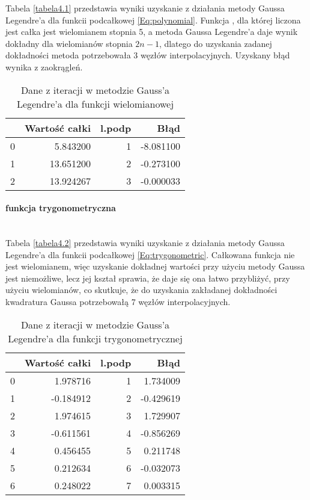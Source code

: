 \documentclass[12pt,twoside]{article}
\begin{document}
Tabela \eqref{tabela4.1} przedstawia wyniki uzyskanie z działania metody Gaussa Legendre'a dla funkcii podcałkowej \eqref{Eq:polynomial}. Funkcja , dla której liczona jest całka jest wielomianem stopnia 5, a metoda Gaussa Legendre'a daje wynik dokładny dla wielomianów stopnia $2n-1$, dlatego do uzyskania zadanej dokładności metoda potrzebowała 3 węzłów interpolacyjnych. Uzyskany błąd wynika z zaokrągleń.

\begin{table}[H]
\centering 
\caption{Dane z iteracji w metodzie Gauss'a Legendre'a dla funkcji wielomianowej}
\label{tabela4.1}
\begin{tabular}{lrrr}
\toprule
{} &  Wartość całki &  l.podp &      Błąd \\
\midrule
0 &       5.843200 &       1 & -8.081100 \\
1 &      13.651200 &       2 & -0.273100 \\
2 &      13.924267 &       3 & -0.000033 \\
\bottomrule
\end{tabular}
\end{table}

\paragraph{funkcja trygonometryczna}\mbox{} \\

Tabela \eqref{tabela4.2} przedstawia wyniki uzyskanie z działania metody Gaussa Legendre'a dla funkcii podcałkowej \eqref{Eq:trygonometric}. Całkowana funkcja nie jest wielomianem, więc uzyskanie dokładnej wartości przy użyciu metody Gaussa jest niemożliwe, lecz jej kształ sprawia, że daje się ona łatwo przybliżyć, przy użyciu wielomianów, co skutkuje, że do uzyskania zakładanej dokładności kwadratura Gaussa potrzebowałą 7 węzłów interpolacyjnych.

\begin{table}[H]
\centering
\caption{Dane z iteracji w metodzie Gauss'a Legendre'a dla funkcji trygonometrycznej}
\label{tabela4.2}
\begin{tabular}{lrrr}
\toprule
{} &  Wartość całki &  l.podp &      Błąd \\
\midrule
0 &       1.978716 &       1 &  1.734009 \\
1 &      -0.184912 &       2 & -0.429619 \\
2 &       1.974615 &       3 &  1.729907 \\
3 &      -0.611561 &       4 & -0.856269 \\
4 &       0.456455 &       5 &  0.211748 \\
5 &       0.212634 &       6 & -0.032073 \\
6 &       0.248022 &       7 &  0.003315 \\
\bottomrule
\end{tabular}
\end{table}
\end{document}

